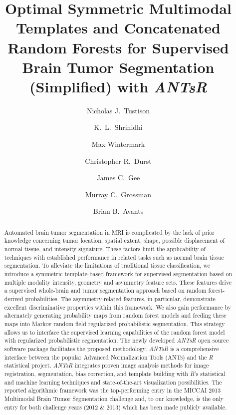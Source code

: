 \documentclass[preprint,authoryear,review,12pt]{elsarticle}
\begin{document}
\begin{frontmatter}

\title{Optimal Symmetric Multimodal Templates and Concatenated Random Forests for Supervised Brain Tumor Segmentation (Simplified) with \textit{ANTsR}}

\author[label1]{Nicholas J.~Tustison
  }
\author[label2]{K.~L.~Shrinidhi}
\author[label1]{Max Wintermark}
\author[label1]{Christopher R.~Durst}
\author[label1]{James C.~Gee}
\author[label3]{Murray C.~Grossman}
\author[label2]{Brian B.~Avants}
\address[label1]{Department of Radiology and Medical Imaging, University of Virginia, Charlottesville, VA}
\address[label2]{Penn Image Computing and Science Laboratory, 
                 Department of Radiology, University of Pennsylvania,
                Philadelphia, PA}
\address[label3]{Department of Neurology, University of Pennsylvania,
                Philadelphia, PA}



\begin{abstract} 
Automated brain tumor segmentation in MRI is complicated by the lack
of prior knowledge concerning tumor location, spatial extent, shape,
possible displacement of normal tissue, and intensity signature.
These factors limit the applicability of techniques with established
performance in related tasks such as normal brain tissue
segmentation.  To alleviate the limitations of traditional tissue
classification, we introduce a symmetric template-based framework for supervised
segmentation based on multiple modality intensity, geometry and asymmetry feature sets.  These features drive a supervised whole-brain and tumor segmentation
approach based on random forest-derived probabilities.  The
asymmetry-related features, in particular, 
demonstrate excellent discriminative properties within this framework. 
We also gain performance by alternately generating
probability maps from random forest models and feeding these maps 
into Markov random field regularized probabilistic segmentation.  This
strategy allows us to interface the supervised learning capabilities of the random forest
model with regularized probabilistic segmentation.  The newly
developed \textit{ANTsR} open source software package facilitates
the proposed methodology.  \textit{ANTsR} is a comprehensive interface between the
popular Advanced Normalization Tools (ANTs) and the \textit{R}
statistical project. \textit{ANTsR} integrates proven image analysis methods
for image registration, segmentation, bias correction, and
template building with \textit{R}'s statistical and machine
learning techniques and state-of-the-art visualization possibilities.  
The reported algorithmic framework was the
top-performing entry in the MICCAI 2013 Multimodal Brain Tumor
Segmentation challenge and, to our knowledge, is the only entry for
both challenge years (2012 \& 2013) which has been made publicly
available.
\end{abstract}


\end{frontmatter}
\end{document}
